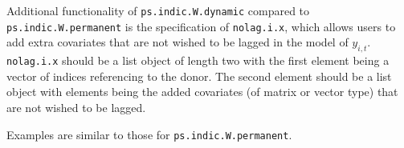 \documentclass[12pt]{article}
\begin{document}
Additional functionality of \texttt{ps.indic.W.dynamic} compared to \texttt{ps.indic.W.permanent} is the specification of \texttt{nolag.i.x}, which allows users to add extra covariates that are not wished to be lagged in the model of $y_{i,t}$. \texttt{nolag.i.x} should be a list object of length two with the first element being a vector of indices referencing to the donor. The second element should be a list object with elements being the added covariates (of matrix or vector type) that are not wished to be lagged. 

Examples are similar to those for \texttt{ps.indic.W.permanent}.



\end{document}
